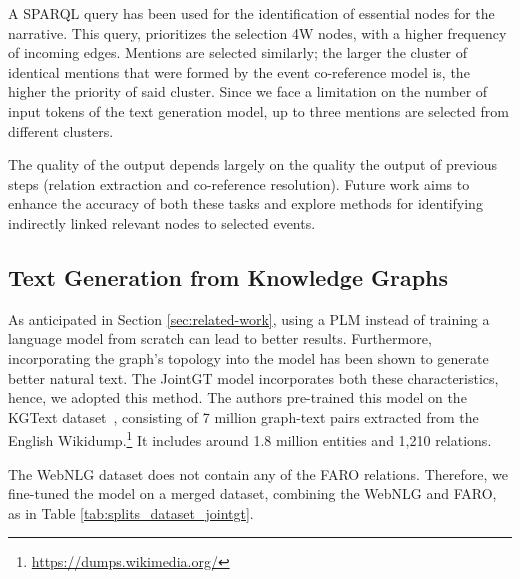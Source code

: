 \documentclass[
hf, %
]{ceurart}
\begin{document}

A SPARQL query has been used for the identification of essential nodes for the narrative. This query, prioritizes the selection 4W nodes, with a higher frequency of incoming edges. Mentions are selected similarly; the larger the cluster of identical mentions that were formed by the event co-reference model is, the higher the priority of said cluster. Since we face a limitation on the number of input tokens of the text generation model, up to three mentions are selected from different clusters.

The quality of the output depends largely on the quality the output of previous steps (relation extraction and co-reference resolution). Future work aims to enhance the accuracy of both these tasks and explore methods for identifying indirectly linked relevant nodes to selected events.


\subsection{Text Generation from Knowledge Graphs}
As anticipated in Section \ref{sec:related-work}, using a PLM instead of training a language model from scratch can lead to better results. Furthermore, incorporating the graph's topology into the model has been shown to generate better natural text. The JointGT model \cite{JointGT} incorporates both these characteristics, hence, we adopted this method. The authors pre-trained this model on the KGText dataset~\cite{KGtext}, consisting of 7 million graph-text pairs extracted from the English Wikidump.\footnote{\url{https://dumps.wikimedia.org/}} It includes around 1.8 million entities and 1,210 relations.

The WebNLG dataset does not contain any of the FARO relations. Therefore, we fine-tuned the model on a merged dataset, combining the WebNLG and FARO, as in Table \ref{tab:splits_dataset_jointgt}.
\end{document}
